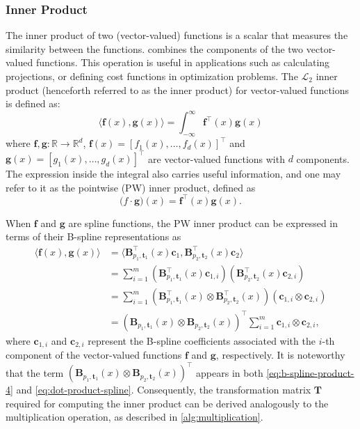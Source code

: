 \subsubsection{Inner Product}
The inner product of two (vector-valued) functions is a scalar that measures the similarity between the functions. combines the components of the two vector-valued functions. This operation is useful in applications such as calculating projections, or defining cost functions in optimization problems. The $\mathcal L_2$ inner product (henceforth referred to as the inner product) for vector-valued functions is defined as:
\begin{equation}
    \label{eq:dot-product}
    \langle\mathbf f(x), \mathbf g(x)\rangle = \int_{-\infty}^\infty \mathbf f^\top(x) \mathbf g(x)
\end{equation}
where $\mathbf f, \mathbf g: \mathbb{R} \to \mathbb{R}^d$, $\mathbf f(x) = [f_1(x), \ldots, f_d(x)]^\top$ and $\mathbf g(x) = [g_1(x), \ldots, g_d(x)]^\top$ are vector-valued functions with $d$ components. The expression inside the integral also carries useful information, and one may refer to it as the pointwise (PW) inner product, defined as
\begin{equation}
    \label{eq:dot-product-pointwise}
    \mathbf (f\cdot \mathbf g)(x) = \mathbf f^\top(x) \mathbf g(x).
\end{equation}

When $\mathbf f$ and $\mathbf g$ are spline functions, the PW inner product can be expressed in terms of their B-spline representations as
\begin{equation}
    \label{eq:dot-product-spline}
    \begin{aligned}
        \langle\mathbf f(x), \mathbf g(x)\rangle &= \langle\mathbf B_{p_1, \mathbf t_1}^\top(x) \mathbf c_1, \mathbf B_{p_2, \mathbf t_2}^\top(x) \mathbf c_2\rangle \\
        &= \sum_{i=1}^m \left(\mathbf B_{p_1, \mathbf t_1}^\top(x) \mathbf c_{1,i}\right) \left(\mathbf B_{p_2, \mathbf t_2}^\top(x) \mathbf c_{2,i}\right) \\
        &= \sum_{i=1}^m \left(\mathbf B_{p_1, \mathbf t_1}^\top(x) \otimes \mathbf B_{p_2, \mathbf t_2}^\top(x)\right) \left(\mathbf c_{1,i} \otimes \mathbf c_{2,i}\right) \\
        &= \left(\mathbf B_{p_1, \mathbf t_1}(x) \otimes \mathbf B_{p_2, \mathbf t_2}(x)\right)^{\top} \sum_{i=1}^m \mathbf c_{1,i} \otimes \mathbf c_{2,i},
    \end{aligned}
\end{equation}
where $\mathbf c_{1,i}$ and $\mathbf c_{2,i}$ represent the B-spline coefficients associated with the $i$-th component of the vector-valued functions $\mathbf f$ and $\mathbf g$, respectively. It is noteworthy that the term $\left(\mathbf B_{p_1, \mathbf t_1}(x) \otimes \mathbf B_{p_2, \mathbf t_2}(x)\right)^{\top}$ appears in both \cref{eq:b-spline-product-4} and \cref{eq:dot-product-spline}. Consequently, the transformation matrix $\mathbf T$ required for computing the inner product can be derived analogously to the multiplication operation, as described in \cref{alg:multiplication}.

